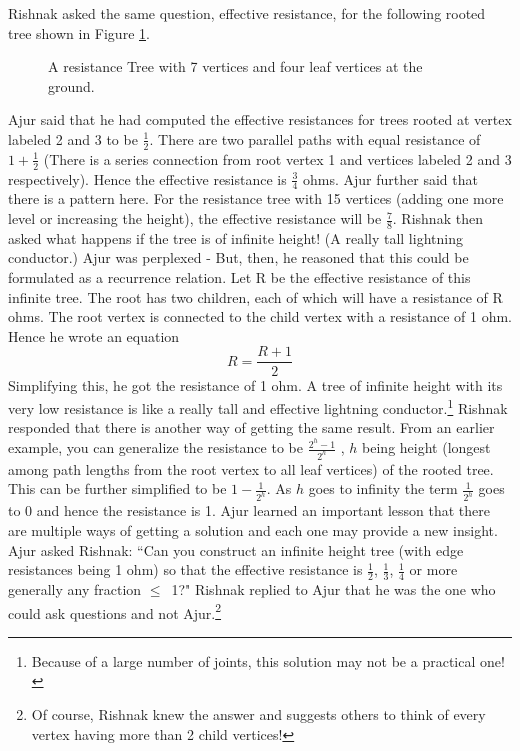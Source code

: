 Rishnak asked the same question, effective resistance, for the following rooted tree shown in Figure \ref{t4}.
\begin{figure}
\begin{center}


\caption{A resistance  Tree with 7 vertices and four leaf vertices at the ground. }\label{t4}
\end{center}
\end{figure}

Ajur said that he had computed the effective resistances for trees rooted at vertex labeled 2 and 3 to be $\frac{1}{2}$. There are two parallel paths with equal resistance of $1+\frac{1}{2}$ (There is a series connection from root vertex 1 and vertices labeled 2 and 3 respectively). Hence the effective resistance is $\frac{3}{4}$ ohms. Ajur further said that there is a pattern here. For the resistance tree with 15 vertices (adding one more level or increasing the height), the effective resistance will be $\frac{7}{8}$. Rishnak then asked what happens if the tree is of infinite height! (A really tall lightning conductor.) Ajur was perplexed - But, then, he reasoned that this could be formulated as a recurrence relation. Let R be the effective resistance of this infinite tree. The root has two children, each of which will have a resistance of R ohms. The root vertex is connected to the child vertex with a resistance of 1 ohm. Hence he wrote an equation $$R= \frac{R+1}{2}$$ Simplifying this, he got the resistance of 1 ohm. A tree of infinite height with its very low resistance is like a really tall and effective lightning conductor.\footnote{Because of a large number of joints, this solution may not be a practical one!} Rishnak responded that there is another way of getting the same result. From an earlier example, you can generalize the resistance to be $\frac{2^h-1}{2^h}$ , $h$ being height (longest among path lengths from the root vertex to all leaf vertices) of the rooted tree. This can be further simplified to be $1-\frac{1}{2^h}$. As $h$ goes to infinity the term $\frac{1}{2^h}$ goes to 0 and hence the resistance is 1. Ajur learned an important lesson that there are multiple ways of getting a solution and each one may provide a new insight. Ajur asked Rishnak: ``Can you construct an infinite height tree (with edge resistances being 1 ohm) so that the effective resistance is $\frac{1}{2}$, $\frac{1}{3}$, $\frac{1}{4}$ or more generally any fraction $\leq$~1?" Rishnak replied to Ajur that he was the one who could ask questions and not Ajur.\footnote{Of course, Rishnak knew the answer and suggests others to think of every vertex having more than 2 child vertices!}

